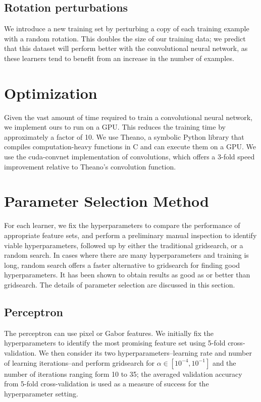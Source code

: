 \documentclass{acm_proc_article-sp}
\begin{document}
\subsection{Rotation perturbations}
We introduce a new training set by perturbing a copy of each training example with a random rotation. This doubles the size of our training data; we predict that this dataset will perform better with the convolutional neural network, as these learners tend to benefit from an increase in the number of examples.

\section{Optimization} 
Given the vast amount of time required to train a convolutional neural network, we implement ours to run on a GPU. This reduces the training time by approximately a factor of 10. We use Theano\cite{Theano}, a symbolic Python library that compiles computation-heavy functions in C and can execute them on a GPU. We use the cuda-convnet implementation of convolutions\cite{Krizhevsky}, which offers a 3-fold speed improvement relative to Theano's convolution function.

\section{Parameter Selection Method}%
For each learner, we fix the hyperparameters to compare the performance of appropriate feature sets, and perform a preliminary manual inspection to identify viable hyperparameters, followed up by either the traditional gridsearch, or a random search. In cases where there are many hyperparameters and training is long, random search offers a faster alternative to gridsearch for finding good hyperparameters. It has been shown to obtain results as good as or better than gridsearch\cite{Bergstra}. The details of parameter selection are discussed in this section.

\subsection{Perceptron}
The perceptron can use pixel or Gabor features. We initially fix the hyperparameters to identify the most promising feature set using 5-fold cross-validation. We then consider its two hyperparameters--learning rate and number of learning iterations--and perform gridsearch for $\alpha \in [10^{-4},10^{-1}]$ and the number of iterations ranging form 10 to 35; the averaged validation accuracy from 5-fold cross-validation is used as a measure of success for the hyperparameter setting. 
\end{document}
